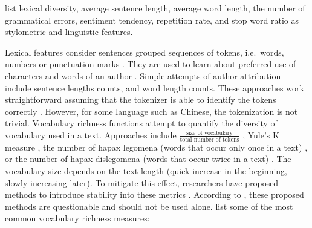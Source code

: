 \citet{bevendorff_overview_2024} list lexical diversity, average sentence length, average word length, 
the number of grammatical errors, sentiment tendency, repetition rate, and stop word ratio as 
stylometric and linguistic features.

Lexical features consider sentences grouped sequences of tokens, i.e.\ words, numbers or punctuation marks \citep{bevendorff_overview_2024}.
They are used to learn about preferred use of characters and words of an author \citep{elmanarelbouanani_authorship_2014}.
Simple attempts of author attribution include sentence lengths counts, and word length counts.
These approaches work straightforward assuming that the tokenizer is able to identify the tokens correctly \citep{bevendorff_overview_2024,elmanarelbouanani_authorship_2014}.
However, for some language such as Chinese, the tokenization is not trivial.
Vocabulary richness functions attempt to quantify the diversity of vocabulary used in a text.
Approaches include $\frac{\text{size of vocabulary}}{\text{total number of tokens}}$ \citep{elmanarelbouanani_authorship_2014,bevendorff_overview_2024},
Yule's K measure \citep{elmanarelbouanani_authorship_2014},
the number of hapax legomena (words that occur only once in a text) \citep{elmanarelbouanani_authorship_2014,bevendorff_overview_2024,weerasinghe_feature_vector_difference_2021}, 
or the number of hapax dislegomena (words that occur twice in a text) \citep{elmanarelbouanani_authorship_2014,weerasinghe_feature_vector_difference_2021}.
The vocabulary size depends on the text length (quick increase in the beginning, slowly increasing later).
To mitigate this effect, researchers have proposed methods to introduce stability into these metrics \citep{elmanarelbouanani_authorship_2014,bevendorff_overview_2024}. 
According to \citet{stamatatos_survey_2009}, these proposed methods are questionable and should not be used alone.
\citet{neal_surveying_2018} list some of the most common vocabulary richness measures:
